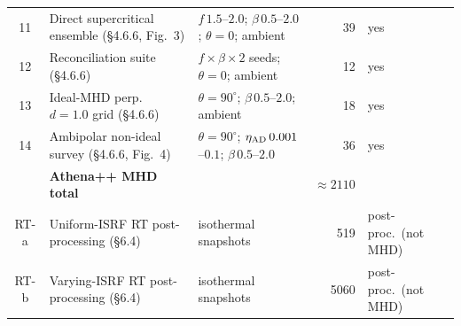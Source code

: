 \begin{table}
\begin{tabular}{cllrl}
11 & Direct supercritical ensemble (\S4.6.6, Fig.~3)& $f\,1.5$--$2.0$; $\beta\,0.5$--$2.0$; $\theta=0$; ambient & 39 & yes \\
12 & Reconciliation suite (\S4.6.6)                 & $f\times\beta\times2$ seeds; $\theta=0$; ambient & 12 & yes \\
13 & Ideal-MHD perp.\ $d=1.0$ grid (\S4.6.6)        & $\theta=90^\circ$; $\beta\,0.5$--$2.0$; ambient & 18 & yes \\
14 & Ambipolar non-ideal survey (\S4.6.6, Fig.~4)   & $\theta=90^\circ$; $\eta_{\rm AD}\,0.001$--$0.1$; $\beta\,0.5$--$2.0$ & 36 & yes \\
\hline
   & \textbf{Athena++ MHD total}                    &  & $\approx\!2110$ & \\
\hline
RT-a & Uniform-ISRF RT post-processing (\S6.4)      & isothermal snapshots & 519 & post-proc.\ (not MHD) \\
RT-b & Varying-ISRF RT post-processing (\S6.4)      & isothermal snapshots & 5060 & post-proc.\ (not MHD) \\
\hline
\end{tabular}
\end{table}
